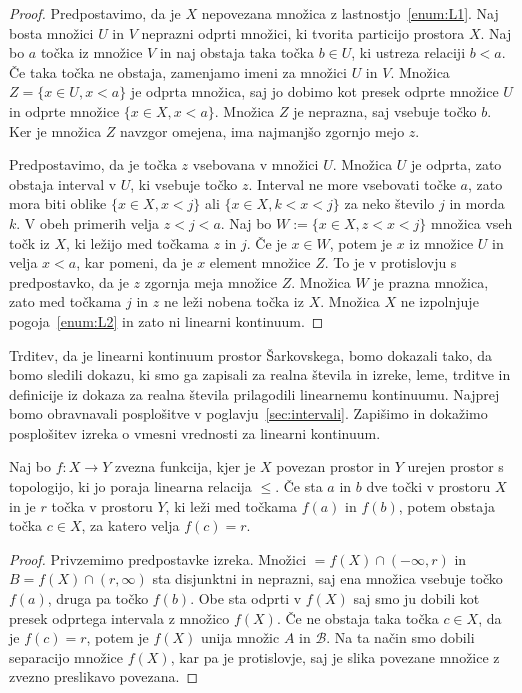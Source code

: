 \documentclass[../TG_magistrsko_delo_sections.tex]{subfiles}
\begin{document}
\begin{proof}
Predpostavimo, da je $X$ nepovezana množica z lastnostjo~\ref{enum:L1}. Naj bosta množici $U$ in $V$ neprazni odprti množici, ki tvorita particijo prostora $X$. Naj bo $a$ točka iz množice $V$ in naj obstaja taka točka $b \in U$, ki ustreza relaciji $b<a$. Če taka točka ne obstaja, zamenjamo imeni za množici $U$ in $V$. Množica $Z = \{x \in U, x<a\}$ je odprta množica, saj jo dobimo kot presek odprte množice $U$ in odprte množice $\{x \in X, x<a\}$. Množica $Z$ je neprazna, saj vsebuje točko $b$. Ker je množica $Z$ navzgor omejena, ima najmanjšo zgornjo mejo $z$.

Predpostavimo, da je točka $z$ vsebovana v množici $U$. Množica $U$ je odprta, zato obstaja interval v $U$, ki vsebuje točko $z$. Interval ne more vsebovati točke $a$, zato mora biti oblike $\{x \in X, x<j\}$ ali $\{x \in X, k<x<j\}$ za neko število $j$ in morda $k$. V obeh primerih velja $z<j<a$. Naj bo $W:=\{x \in X, z<x<j\}$ množica vseh točk iz $X$, ki ležijo med točkama $z$ in $j$. Če je $x \in W$, potem je $x$ iz množice $U$ in velja $x<a$, kar pomeni, da je $x$ element množice $Z$. To je v protislovju s predpostavko, da je $z$ zgornja meja množice $Z$. Množica $W$ je prazna množica, zato med točkama $j$ in $z$ ne leži nobena točka iz $X$. Množica $X$ ne izpolnjuje pogoja~\ref{enum:L2} in zato ni linearni kontinuum.
\end{proof}

Trditev, da je linearni kontinuum prostor Šarkovskega, bomo dokazali tako, da bomo sledili dokazu, ki smo ga zapisali za realna števila in izreke, leme, trditve in definicije iz dokaza za realna števila prilagodili linearnemu kontinuumu. Najprej bomo obravnavali posplošitve v poglavju~\ref{sec:intervali}. Zapišimo in dokažimo posplošitev izreka o vmesni vrednosti za linearni kontinuum.

\begin{izrek}
Naj bo $f : X \to Y$ zvezna funkcija, kjer je $X$ povezan prostor in $Y$ urejen prostor s topologijo, ki jo poraja linearna relacija $\leq$. Če sta $a$ in $b$ dve točki v prostoru $X$ in je $r$ točka v prostoru $Y$, ki leži med točkama $f(a)$ in $f(b)$, potem obstaja točka $c \in X$, za katero velja $f(c) = r$.
\end{izrek}
\begin{proof}
Privzemimo predpostavke izreka. Množici $=f(X) \cap (-\infty, r)$ in $B=f(X) \cap (r, \infty)$ sta disjunktni in neprazni, saj ena množica vsebuje točko $f(a)$, druga pa točko $f(b)$. Obe sta odprti v $f(X)$ saj smo ju dobili kot presek odprtega intervala z množico $f(X)$. Če ne obstaja taka točka $c \in X$, da je $f(c) = r$, potem je $f(X)$ unija množic $A$ in $\mathcal{B}$. Na ta način smo dobili separacijo množice $f(X)$, kar pa je protislovje, saj je slika povezane množice z zvezno preslikavo povezana.
\end{proof}
\end{document}
